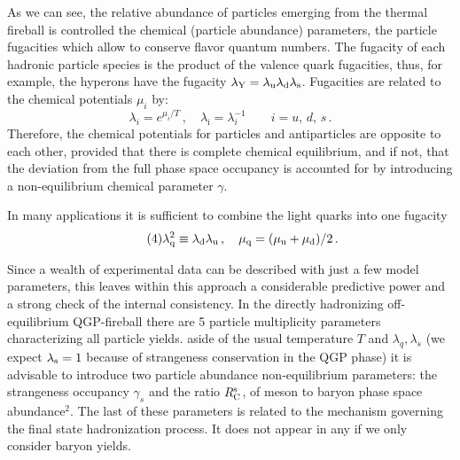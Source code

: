 \begin{mdframed}[linecolor=gray,roundcorner=12pt,backgroundcolor=Dandelion!15,linewidth=1pt,leftmargin=0cm,rightmargin=0cm,topline=true,bottomline=true,skipabove=12pt]
As we can see, the relative abundance of particles emerging from
the thermal fireball is controlled the chemical (particle
abundance) 
parameters, the particle fugacities which allow to
conserve flavor quantum numbers. The fugacity of each hadronic 
particle species is the product of the valence quark fugacities, 
thus, for example, the hyperons have the fugacity 
$\lambda_{\rm Y}=\lambda_{\rm u}\lambda_{\rm d}\lambda_{\rm s}$.
Fugacities are related to the chemical potentials $\mu_i$ by:
\begin{equation}\tag{3}
\lambda_{i} =e^{\mu_{i}/T}\,,\quad 
\lambda_{\bar{\imath}}=\lambda_i^{-1}\qquad 
i={u,\,d,\,s}\, . \label{lam}
 \end{equation}
Therefore, the chemical potentials for particles and 
antiparticles are opposite to each other, provided that there is
complete chemical equilibrium, and if not, that the deviation from
the full phase space occupancy is accounted for by introducing a 
 non-equilibrium chemical parameter $\gamma$.
 
In many applications it is sufficient to combine the
light quarks into one fugacity 
\begin{equation}\tag{4}
\lambda_{\rm q}^2\equiv\lambda_{\rm d}\lambda_{\rm u}\,,\quad 
\mu_{\rm q}=({\mu_{\rm u}+\mu_{\rm d}})/2\,. \end{equation}

Since a wealth of experimental data can be described with just a
few model parameters, this leaves within this approach a
considerable predictive power and a strong check of the internal
consistency. In the directly hadronizing 
off-equilibrium QGP-fireball there are 5
particle multiplicity parameters characterizing all particle
yields. aside of the usual temperature $T$ and
$\lambda_q,\lambda_s$ (we expect $\lambda_{\rm
s}=1$ because of strangeness conservation in the QGP phase) it is
advisable to introduce two
particle abundance non-equilibrium parameters: the strangeness 
occupancy $\gamma_{s}$ and the ratio $R^{\rm s}_{\rm
C}$, of meson to baryon phase space abundance$^{2}$. The
last of these parameters is related to the mechanism 
governing the final state hadronization process. It does not appear
in any if we only consider baryon yields.


\end{mdframed}

